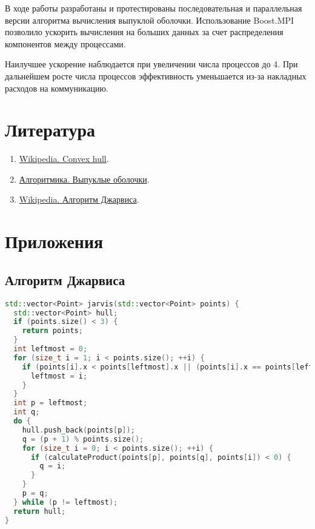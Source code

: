 \documentclass[a4paper,12pt]{article}
\begin{document}
\hspace*{1.25em}В ходе работы разработаны и протестированы последовательная и параллельная версии алгоритма вычисления выпуклой оболочки. Использование Boost.MPI позволило ускорить вычисления на больших данных за счет распределения компонентов между процессами. 

Наилучшее ускорение наблюдается при увеличении числа процессов до 4. При дальнейшем росте числа процессов эффективность уменьшается из-за накладных расходов на коммуникацию.

\section{Литература}
\begin{enumerate}
    \item \href{https://en.wikipedia.org/wiki/Convex_hull}{Wikipedia. Convex hull}.
    \item \href{https://algorithmica.org/ru/convex-hulls}{Алгоритмика. Выпуклые оболочки}.
    \item \href{https://ru.wikipedia.org/wiki/%D0%90%D0%BB%D0%B3%D0%BE%D1%80%D0%B8%D1%82%D0%BC_%D0%94%D0%B6%D0%B0%D1%80%D0%B2%D0%B8%D1%81%D0%B0}{Wikipedia. Алгоритм Джарвиса}.
\end{enumerate}

\section{Приложения}
\subsection*{Алгоритм Джарвиса}
\begin{lstlisting}[language=C++]
std::vector<Point> jarvis(std::vector<Point> points) {
  std::vector<Point> hull;
  if (points.size() < 3) {
    return points;
  }
  int leftmost = 0;
  for (size_t i = 1; i < points.size(); ++i) {
    if (points[i].x < points[leftmost].x || (points[i].x == points[leftmost].x && points[i].y < points[leftmost].y)) {
      leftmost = i;
    }
  }
  int p = leftmost;
  int q;
  do {
    hull.push_back(points[p]);
    q = (p + 1) % points.size();
    for (size_t i = 0; i < points.size(); ++i) {
      if (calculateProduct(points[p], points[q], points[i]) < 0) {
        q = i;
      }
    }
    p = q;
  } while (p != leftmost);
  return hull;
}
\end{lstlisting}
\end{document}
